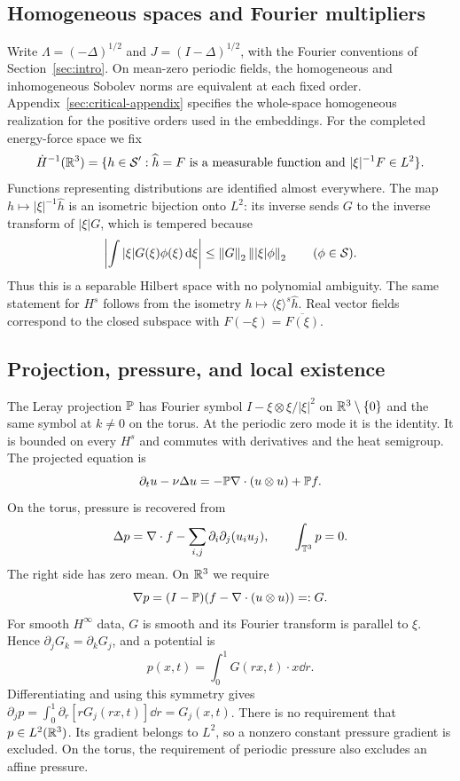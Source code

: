 \subsection{Homogeneous spaces and Fourier multipliers}
Write $\Lambda=(-\Delta)^{1/2}$ and $J=(I-\Delta)^{1/2}$, with the
Fourier conventions of Section~\ref{sec:intro}. On mean-zero periodic
fields, the homogeneous and inhomogeneous Sobolev norms are equivalent
at each fixed order. Appendix~\ref{sec:critical-appendix} specifies the
whole-space homogeneous realization for the positive orders used in the
embeddings.
For the completed energy-force space we fix
\begin{equation}\label{eq:homogeneous-realization}
 \dot H^{-1}(\mathbb R^3)=\{h\in\mathcal S':\widehat h=F
 \text{ is a measurable function and }|\xi|^{-1}F\in L^2\}.
\end{equation}
Functions representing distributions are identified almost everywhere.
The map $h\mapsto|\xi|^{-1}\widehat h$ is an isometric bijection onto
$L^2$: its inverse sends $G$ to the inverse transform of $|\xi|G$, which
is tempered because
\[
 \left|\int|\xi|G(\xi)\phi(\xi)\,\mathrm d\xi\right|
 \le\left\lVert G\right\rVert_2\left\lVert|\xi|\phi\right\rVert_2\qquad(\phi\in\mathcal S).
\]
Thus this is a separable Hilbert space with no polynomial ambiguity.
The same statement for $H^s$ follows from the isometry
$h\mapsto\langle\xi\rangle^s\widehat h$. Real vector fields correspond
to the closed subspace with $F(-\xi)=\overline{F(\xi)}$.

\subsection{Projection, pressure, and local existence}\label{sec:analytic}
The Leray projection $\mathbb P$ has Fourier symbol
$I-\xi\otimes\xi/|\xi|^2$ on $\mathbb R^3\setminus\{0\}$ and the same
symbol at $k\ne0$ on the torus. At the periodic zero mode it is the
identity. It is bounded on every $H^s$ and commutes with derivatives and
the heat semigroup. The projected equation is
\begin{equation}\label{eq:projected}
 \partial_tu-\nu\Delta u=-\mathbb P\nabla\cdot(u\otimes u)+\mathbb P f.
\end{equation}
On the torus, pressure is recovered from
\[
 \Delta p=\nabla\cdot f-\sum_{i,j}\partial_i\partial_j(u_i u_j),
 \qquad \int_{\mathbb T^3}p=0.
\]
The right side has zero mean. On $\mathbb R^3$ we require
\begin{equation}\label{eq:Rpressure}
 \nabla p=(I-\mathbb P)(f-\nabla\cdot(u\otimes u))=:G.
\end{equation}
For smooth $H^\infty$ data, $G$ is smooth and its Fourier transform is
parallel to $\xi$. Hence $\partial_jG_k=\partial_kG_j$, and a potential
is
\[
 p(x,t)=\int_0^1G(rx,t)\cdot x\dd r.
\]
Differentiating and using this symmetry gives
$\partial_jp=\int_0^1\partial_r[rG_j(rx,t)]\dd r=G_j(x,t)$.
There is no requirement that $p\in L^2(\mathbb R^3)$. Its gradient belongs to
$L^2$, so a nonzero constant pressure gradient is excluded. On the torus,
the requirement of periodic pressure also excludes an affine pressure.


